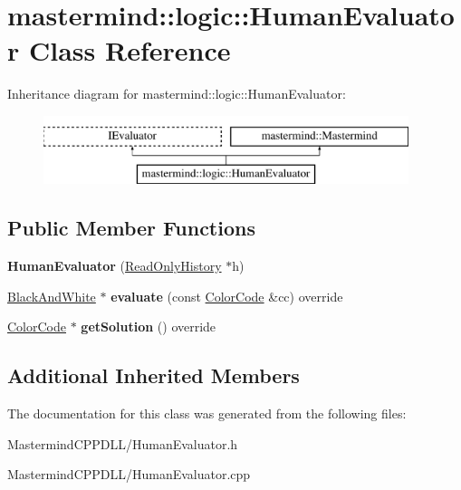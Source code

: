 \hypertarget{classmastermind_1_1logic_1_1_human_evaluator}{}\section{mastermind\+:\+:logic\+:\+:Human\+Evaluator Class Reference}
\label{classmastermind_1_1logic_1_1_human_evaluator}
Inheritance diagram for mastermind\+:\+:logic\+:\+:Human\+Evaluator\+:\begin{figure}[H]
\begin{center}
\leavevmode
\includegraphics[height=2.000000cm]{classmastermind_1_1logic_1_1_human_evaluator}
\end{center}
\end{figure}
\subsection*{Public Member Functions}
\begin{DoxyCompactItemize}
\item 
\hypertarget{classmastermind_1_1logic_1_1_human_evaluator_ab1e96e3389a2932631a302e3cbaef8ff}{}\label{classmastermind_1_1logic_1_1_human_evaluator_ab1e96e3389a2932631a302e3cbaef8ff} 
{\bfseries Human\+Evaluator} (\hyperlink{classmastermind_1_1logic_1_1_read_only_history}{Read\+Only\+History} $\ast$h)
\item 
\hypertarget{classmastermind_1_1logic_1_1_human_evaluator_ac427121219b8e69ed30b0e123ce622a4}{}\label{classmastermind_1_1logic_1_1_human_evaluator_ac427121219b8e69ed30b0e123ce622a4} 
\hyperlink{classmastermind_1_1logic_1_1_black_and_white}{Black\+And\+White} $\ast$ {\bfseries evaluate} (const \hyperlink{classmastermind_1_1logic_1_1_color_code}{Color\+Code} \&cc) override
\item 
\hypertarget{classmastermind_1_1logic_1_1_human_evaluator_ab369895151e4702e8b57d74c8f6869db}{}\label{classmastermind_1_1logic_1_1_human_evaluator_ab369895151e4702e8b57d74c8f6869db} 
\hyperlink{classmastermind_1_1logic_1_1_color_code}{Color\+Code} $\ast$ {\bfseries get\+Solution} () override
\end{DoxyCompactItemize}
\subsection*{Additional Inherited Members}


The documentation for this class was generated from the following files\+:\begin{DoxyCompactItemize}
\item 
Mastermind\+C\+P\+P\+D\+L\+L/Human\+Evaluator.\+h\item 
Mastermind\+C\+P\+P\+D\+L\+L/Human\+Evaluator.\+cpp\end{DoxyCompactItemize}
